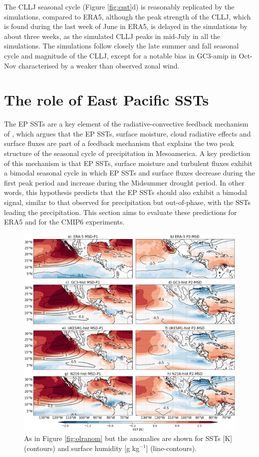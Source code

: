 The CLLJ seasonal cycle (Figure \ref{fig:csst}d) is reasonably replicated by the simulations, compared to ERA5, although the peak strength of the CLLJ, which is found during the last week of June in ERA5, is delayed in the simulations by about three weeks, as the simulated CLLJ peaks in mid-July in all the simulations.
The simulations follow closely the late summer and fall seasonal cycle and magnitude of the CLLJ, except for a notable bias in GC3-amip in Oct-Nov characterised by a weaker than observed zonal wind.

\section{The role of East Pacific SSTs}

 The EP SSTs are a key element of the radiative-convective feedback mechanism of \cite{magana1999}, which argues that the EP SSTs, surface moisture, cloud radiative effects and surface fluxes are part of a feedback mechanism that explains the two peak structure of the seasonal cycle of precipitation in Mesoamerica. A key prediction of this mechanism is that EP SSTs, surface moisture and turbulent fluxes exhibit a bimodal  seasonal cycle in which EP SSTs and surface fluxes decrease during the first peak period and increase during the Midsummer drought period. In other words, this hypothesis predicts that the EP SSTs should also exhibit a bimodal signal, similar to that observed for precipitation but out-of-phase, with the SSTs leading the precipitation. This section aims to evaluate these predictions for ERA5 and for the CMIP6 experiments. 

 
\begin{figure}[b!]
\includegraphics[width=\linewidth]{figures/fig4_sstv_3.png}
\caption[Composite SST anomalies]{As in Figure \ref{fig:olranom} but the anomalies are shown for SSTs [K] (contours) and surface humidity [g kg$^{-1}$] (line-contours).  }
\label{fig:msdsstanom}
\end{figure}

